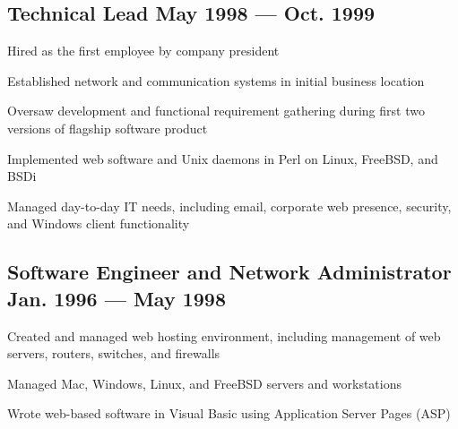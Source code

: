 \documentclass[letter,10pt]{article}
\begin{document}
\subsection{Technical Lead \hfill May 1998 --- Oct. 1999}
\begin{zitemize}
	\item Hired as the first employee by company president
	\item Established network and communication systems in initial
	business location
	\item Oversaw development and functional requirement gathering
	during first two versions of flagship software product
	\item Implemented web software and Unix daemons in Perl on
	Linux, FreeBSD, and BSDi
	\item Managed day-to-day IT needs, including email, corporate
	web presence, security, and Windows client functionality
\end{zitemize}

\subsection{Software Engineer and Network Administrator \hfill Jan. 1996
	--- May 1998}
\begin{zitemize}
	\item Created and managed web hosting environment, including
	management of web servers, routers, switches, and firewalls
	\item Managed Mac, Windows, Linux, and FreeBSD servers and
	workstations
	\item Wrote web-based software in Visual Basic using Application
	Server Pages (ASP)
\end{zitemize}
\end{document}
